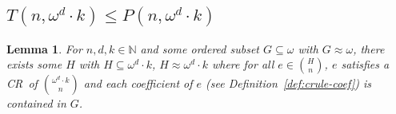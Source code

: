 \documentclass[11pt]{article}
\newcommand{\om}{\omega}
\newcommand{\oequiv}{\approx}
\newcommand{\N}{\mathbb{N}}
\newcommand{\crulenospace}{CR}
\newcommand{\crule}{\crulenospace~}
\newcommand{\numpoints}{n}
\theoremstyle{plain}
\newtheorem{lemma}[theorem]{Lemma}
\theoremstyle{definition}
\begin{document}
\subsection{\texorpdfstring{$T(\numpoints,\om^d \cdot k) \leq P(\numpoints,\om^d \cdot k)$}{T(\numpoints, omega d k) <= P(\numpoints, omega d k)}}

\begin{lemma}
\label{le:bend-nats-k}
For $\numpoints,d,k \in \N$ and some ordered subset $G \subseteq \om$ with
$G \oequiv \om$, there exists some $H$ with $H \subseteq \om^d \cdot k$, $H \oequiv \om^d \cdot k$ where for all $e \in \binom{H}{\numpoints}$, $e$ satisfies a \crule of $\binom{\om^d \cdot k}{\numpoints}$ and each coefficient of $e$ (see Definition~\ref{def:crule-coef})
is contained in $G$.
\end{lemma}
\end{document}
